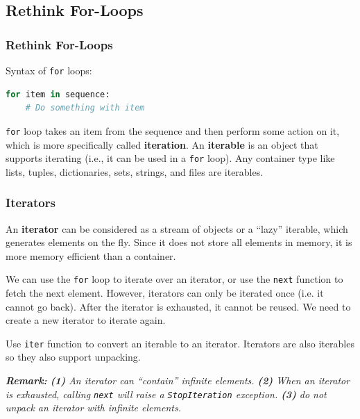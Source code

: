\documentclass[beamer, en, version=2.0]{huangfusl-template}
\begin{document}
    \subsection{Rethink For-Loops}
    \begin{frame}[fragile]
        \frametitle{Rethink For-Loops}

        Syntax of {\footnotesize\verb|for|} loops:

\begin{lstlisting}[language=python]
for item in sequence:
    # Do something with item
\end{lstlisting}

        {\footnotesize\verb|for|} loop takes an item from the sequence and then perform some action on it, which is more specifically called \textbf{iteration}. An \textbf{iterable} is an object that supports iterating (i.e., it can be used in a {\footnotesize\verb|for|} loop). Any container type like lists, tuples, dictionaries, sets, strings, and files are iterables.

    \end{frame}
    \begin{frame}[fragile]
        \frametitle{Iterators}

        An \textbf{iterator} can be considered as a stream of objects or a ``lazy'' iterable, which generates elements on the fly. Since it does not store all elements in memory, it is more memory efficient than a container.

        We can use the {\footnotesize\verb|for|} loop to iterate over an iterator, or use the {\footnotesize\verb|next|} function to fetch the next element. However, iterators can only be iterated once (i.e. it cannot go back). After the iterator is exhausted, it cannot be reused. We need to create a new iterator to iterate again.

        Use {\footnotesize\verb|iter|} function to convert an iterable to an iterator. Iterators are also iterables so they also support unpacking.

        {\footnotesize\itshape\textbf{Remark:} \textbf{(1)} An iterator can ``contain'' infinite elements. \textbf{(2)} When an iterator is exhausted, calling {\scriptsize\verb|next|} will raise a {\scriptsize\verb|StopIteration|} exception. \textbf{(3)} do not unpack an iterator with infinite elements.}
    \end{frame}
\end{document}
